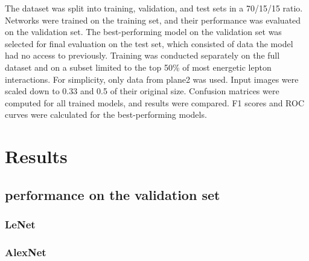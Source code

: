 \documentclass{pracalicmgr}
\begin{document}
The dataset was split into training, validation, and test sets in a 70/15/15 ratio. Networks were trained on the training set, and their performance was evaluated on the validation set. The best-performing model on the validation set was selected for final evaluation on the test set, which consisted of data the model had no access to previously. Training was conducted separately on the full dataset and on a subset limited to the top 50\% of most energetic lepton interactions. For simplicity, only data from plane2 was used. Input images were scaled down to 0.33 and 0.5 of their original size. Confusion matrices were computed for all trained models, and results were compared. F1 scores and ROC curves were calculated for the best-performing models.



\section{Results}
\subsection{performance on the validation set}

\subsubsection{LeNet}

\newpage

\subsubsection{AlexNet}
\end{document}

